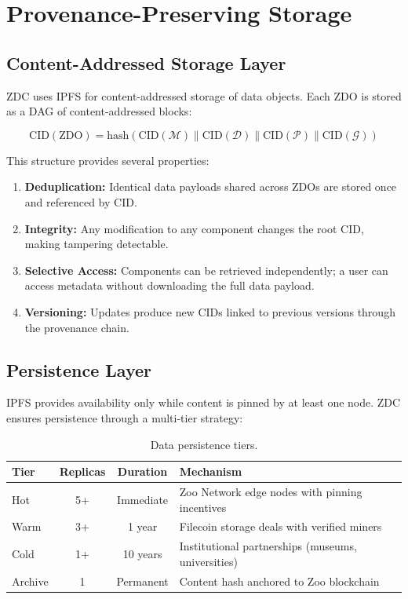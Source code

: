 \documentclass[11pt,a4paper]{article}
\begin{document}
\section{Provenance-Preserving Storage}
\label{sec:storage}

\subsection{Content-Addressed Storage Layer}

ZDC uses IPFS for content-addressed storage of data objects.
Each ZDO is stored as a DAG of content-addressed blocks:

\begin{equation}
    \text{CID}(\text{ZDO}) = \text{hash}(\text{CID}(\mathcal{M}) \| \text{CID}(\mathcal{D}) \| \text{CID}(\mathcal{P}) \| \text{CID}(\mathcal{G}))
\end{equation}

This structure provides several properties:

\begin{enumerate}[leftmargin=*]
    \item \textbf{Deduplication:} Identical data payloads shared across ZDOs are stored once and referenced by CID.
    \item \textbf{Integrity:} Any modification to any component changes the root CID, making tampering detectable.
    \item \textbf{Selective Access:} Components can be retrieved independently; a user can access metadata without downloading the full data payload.
    \item \textbf{Versioning:} Updates produce new CIDs linked to previous versions through the provenance chain.
\end{enumerate}

\subsection{Persistence Layer}

IPFS provides availability only while content is pinned by at least one node.
ZDC ensures persistence through a multi-tier strategy:

\begin{table}[H]
\centering
\caption{Data persistence tiers.}
\label{tab:persistence}
\begin{tabularx}{\textwidth}{@{}lccX@{}}
\toprule
\textbf{Tier} & \textbf{Replicas} & \textbf{Duration} & \textbf{Mechanism} \\
\midrule
Hot & 5+ & Immediate & Zoo Network edge nodes with pinning incentives \\
Warm & 3+ & 1 year & Filecoin storage deals with verified miners \\
Cold & 1+ & 10 years & Institutional partnerships (museums, universities) \\
Archive & 1 & Permanent & Content hash anchored to Zoo blockchain \\
\bottomrule
\end{tabularx}
\end{table}
\end{document}
